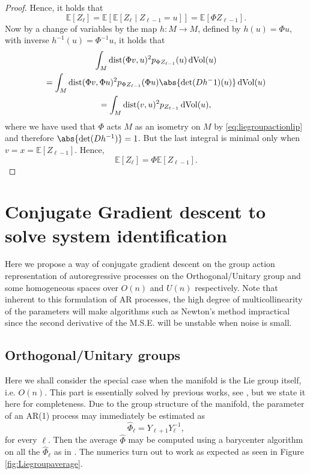 \documentclass[12pt,a4paper]{article}
\theoremstyle{definition}
\theoremstyle{remark}
\DeclareMathOperator{\dist}{dist}
\DeclareMathOperator{\dVol}{dVol}
\begin{document}
\begin{proof}
Hence, it holds that
\[
\mathbb{E}[Z_\ell]=\mathbb{E}[\mathbb{E}[Z_{\ell}\mid Z_{\ell-1}=u]] = \mathbb{E}[\Phi Z_{\ell-1}].
\]
Now by a change of variables by the map $h:M\rightarrow M$, defined by $h(u)= \Phi u$, with inverse $h^{-1}(u)=\Phi^{-1} u$, it holds that
\begin{multline*}
\int_M \dist(\Phi v,u)^2 p_{ \Phi Z_{\ell-1}}(u) \dVol(u) \\= \int_M \dist(\Phi v,\Phi u)^2 p_{\Phi Z_{\ell-1}}(\Phi u) \abs{\det(D h^-1)(u)} \dVol(u)\\ = \int_{M} \dist(v, u)^2 p_{Z_{\ell-1}} \dVol(u),
\end{multline*}
where we have used that $\Phi$ acts $M$ as an isometry on $M$ by \eqref{eq:liegroupactionlip} and therefore $\abs{\det(D h^{-1})}=1$. But the last integral is minimal only when $v=x= \mathbb{E}[Z_{\ell-1}]$. Hence,
\[
\mathbb{E}[Z_\ell] = \Phi \mathbb{E}[Z_{\ell-1}].
\]

\end{proof}



\section{Conjugate Gradient descent to solve system identification}
\label{sec:conjgrad}

Here we propose a way of conjugate gradient descent on the group action representation of autoregressive processes on the Orthogonal/Unitary group and some homogeneous spaces over $O(n)$ and $U(n)$ respectively. Note that inherent to this formulation of AR processes, the high degree of multicollinearity of the parameters will make algorithms such as Newton's method impractical since the second derivative of the M.S.E. will be unstable when noise is small.

\subsection{Orthogonal/Unitary groups}
\label{sec:orth}

Here we shall consider the special case when the manifold is the Lie group itself, i.e. $O(n)$. This part is essentially solved by previous works, see \cite{fiori2009algorithm}, but we state it here for completeness. Due to the group structure of the manifold, the parameter of an AR(1) process may immediately be estimated as
\[
\hat{\Phi}_{\ell}=Y_{\ell+1} Y_{\ell}^{-1},
\]
for every $\ell$. Then the average $\hat{\Phi}$ may be computed using a barycenter algorithm on all the $\hat{\Phi}_{\ell}$ as in \cite{pennec2013exponential}. The numerics turn out to work as expected as seen in Figure \ref{fig:Liegroupaverage}.
\end{document}

